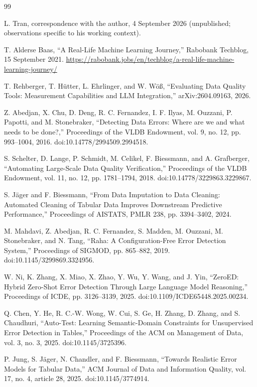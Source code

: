 \documentclass[11pt,a4paper]{article}
\begin{document}
\begin{thebibliography}{99}
\small
\setlength{\itemsep}{2pt}
\setlength{\parskip}{0pt}

 L. Tran, correspondence with the author, 4 September 2026 (unpublished; observations specific to his working context).

 T. Alderse Baas, ``A Real-Life Machine Learning Journey,'' Rabobank Techblog, 15 September 2021. \url{https://rabobank.jobs/en/techblog/a-real-life-machine-learning-journey/}

 T. Rehberger, T. H\"utter, L. Ehrlinger, and W. W\"o{\ss}, ``Evaluating Data Quality Tools: Measurement Capabilities and LLM Integration,'' arXiv:2604.09163, 2026.

 Z. Abedjan, X. Chu, D. Deng, R. C. Fernandez, I. F. Ilyas, M. Ouzzani, P. Papotti, and M. Stonebraker, ``Detecting Data Errors: Where are we and what needs to be done?,'' Proceedings of the VLDB Endowment, vol. 9, no. 12, pp. 993--1004, 2016. doi:10.14778/2994509.2994518.

 S. Schelter, D. Lange, P. Schmidt, M. Celikel, F. Biessmann, and A. Grafberger, ``Automating Large-Scale Data Quality Verification,'' Proceedings of the VLDB Endowment, vol. 11, no. 12, pp. 1781--1794, 2018. doi:10.14778/3229863.3229867.

 S. J\"ager and F. Biessmann, ``From Data Imputation to Data Cleaning: Automated Cleaning of Tabular Data Improves Downstream Predictive Performance,'' Proceedings of AISTATS, PMLR 238, pp. 3394--3402, 2024.

 M. Mahdavi, Z. Abedjan, R. C. Fernandez, S. Madden, M. Ouzzani, M. Stonebraker, and N. Tang, ``Raha: A Configuration-Free Error Detection System,'' Proceedings of SIGMOD, pp. 865--882, 2019. doi:10.1145/3299869.3324956.

 W. Ni, K. Zhang, X. Miao, X. Zhao, Y. Wu, Y. Wang, and J. Yin, ``ZeroED: Hybrid Zero-Shot Error Detection Through Large Language Model Reasoning,'' Proceedings of ICDE, pp. 3126--3139, 2025. doi:10.1109/ICDE65448.2025.00234.

 Q. Chen, Y. He, R. C.-W. Wong, W. Cui, S. Ge, H. Zhang, D. Zhang, and S. Chaudhuri, ``Auto-Test: Learning Semantic-Domain Constraints for Unsupervised Error Detection in Tables,'' Proceedings of the ACM on Management of Data, vol. 3, no. 3, 2025. doi:10.1145/3725396.

 P. Jung, S. J\"ager, N. Chandler, and F. Biessmann, ``Towards Realistic Error Models for Tabular Data,'' ACM Journal of Data and Information Quality, vol. 17, no. 4, article 28, 2025. doi:10.1145/3774914.


\end{thebibliography}
\end{document}
